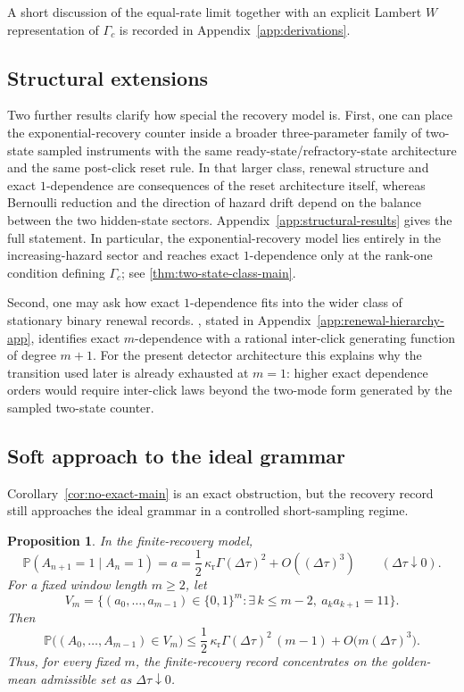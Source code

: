 \documentclass[11pt]{article}
\newtheorem{proposition}[theorem]{Proposition}
\theoremstyle{definition}
\newcommand{\PP}{\mathbb{P}}
\begin{document}
A short discussion of the equal-rate limit together with an explicit Lambert $W$ representation of $\Gamma_c$ is recorded in Appendix~\ref{app:derivations}.

\subsection{Structural extensions}

Two further results clarify how special the recovery model is. First, one can place the exponential-recovery counter inside a broader three-parameter family of two-state sampled instruments with the same ready-state/refractory-state architecture and the same post-click reset rule. In that larger class, renewal structure and exact $1$-dependence are consequences of the reset architecture itself, whereas Bernoulli reduction and the direction of hazard drift depend on the balance between the two hidden-state sectors. Appendix~\ref{app:structural-results} gives the full statement. In particular, the exponential-recovery model lies entirely in the increasing-hazard sector and reaches exact $1$-dependence only at the rank-one condition defining $\Gamma_c$; see \cref{thm:two-state-class-main}.

Second, one may ask how exact $1$-dependence fits into the wider class of stationary binary renewal records. , stated in Appendix~\ref{app:renewal-hierarchy-app}, identifies exact $m$-dependence with a rational inter-click generating function of degree $m+1$. For the present detector architecture this explains why the transition used later is already exhausted at $m=1$: higher exact dependence orders would require inter-click laws beyond the two-mode form generated by the sampled two-state counter.

\subsection{Soft approach to the ideal grammar}

Corollary~\ref{cor:no-exact-main} is an exact obstruction, but the recovery record still approaches the ideal grammar in a controlled short-sampling regime.

\begin{proposition}\label{prop:soft-main}
In the finite-recovery model,
\begin{equation}\label{eq:soft-main}
\PP(A_{n+1}=1\mid A_n=1)=a
=\frac12\,\kappa_{\mathrm r}\Gamma(\Delta\tau)^2+O((\Delta\tau)^3)
\qquad (\Delta\tau\downarrow0).
\end{equation}
For a fixed window length $m\ge2$, let
\[
V_m=\{(a_0,\dots,a_{m-1})\in\{0,1\}^m:\exists\,k\le m-2,\ a_ka_{k+1}=11\}.
\]
Then
\begin{equation}\label{eq:window-main}
\PP\!\bigl((A_0,\dots,A_{m-1})\in V_m\bigr)
\le
\frac12\,\kappa_{\mathrm r}\Gamma(\Delta\tau)^2\,(m-1)
+O\!\bigl(m(\Delta\tau)^3\bigr).
\end{equation}
Thus, for every fixed $m$, the finite-recovery record concentrates on the golden-mean admissible set as $\Delta\tau\downarrow0$.
\end{proposition}
\end{document}
